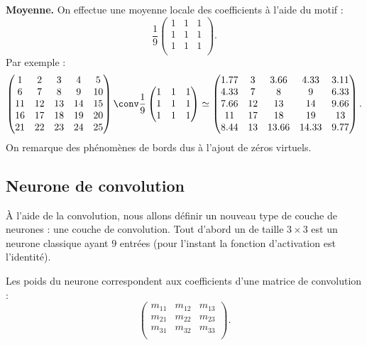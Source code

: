 \documentclass[11pt,class=report,crop=false]{standalone}
\begin{document}
\textbf{Moyenne.}
On effectue une moyenne locale des coefficients à l'aide du motif :
$$\frac19 
\begin{pmatrix}
1 & 1 & 1 \\
1 & 1 & 1 \\
1 & 1 & 1 \\
\end{pmatrix}.$$
Par exemple :
$$
\begin{pmatrix}
 1 &  2 &  3 &  4 &  5\\
 6 &  7 &  8 &  9 & 10\\
11 & 12 & 13 & 14 & 15\\
16 & 17 & 18 & 19 & 20\\
21 & 22 & 23 & 24 & 25
\end{pmatrix}
\conv 
\frac19 \begin{pmatrix}
1 & 1 & 1 \\
1 & 1 & 1 \\
1 & 1 & 1 \\
\end{pmatrix}
\simeq 
\begin{pmatrix}
1.77 &  3 &   3.66  &  4.33  &  3.11\\
4.33 &  7 &   8     &  9     &  6.33\\
7.66 & 12 &   13    &  14    &  9.66\\
11  & 17 &    18    &  19    &  13  \\
8.44 & 13 &   13.66 &  14.33 &  9.77\\
\end{pmatrix}.$$
On remarque des phénomènes de bords dus à l'ajout de zéros virtuels.


\subsection{Neurone de convolution}

\`A l'aide de la convolution, nous allons définir un nouveau type de couche de neurones : une \og{}couche de convolution\fg{}.
Tout d'abord un  de taille $3\times 3$ est un neurone classique ayant $9$ entrées (pour l'instant la fonction d'activation est l'identité).




Les poids du neurone correspondent aux coefficients d'une matrice de convolution :
$$\begin{pmatrix}
m_{11} & m_{12} & m_{13} \\
m_{21} & m_{22} & m_{23} \\
m_{31} & m_{32} & m_{33} \\
\end{pmatrix}.$$
\end{document}
